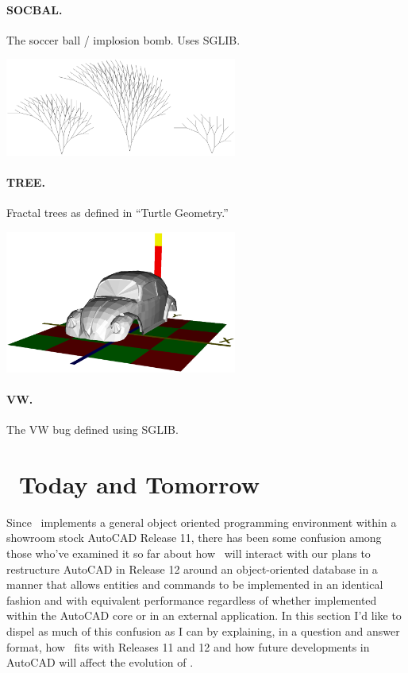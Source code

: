 \documentclass{article}
\begin{document}
\paragraph{SOCBAL.}  The soccer ball / implosion bomb.  Uses SGLIB.

\centerline{\includegraphics[width=3in]{cwfig13.eps}}
\paragraph{TREE.}  Fractal trees as defined in ``Turtle Geometry.''

\centerline{\includegraphics[width=3in]{cwfig7.eps}}
\paragraph{VW.}  The VW bug defined using SGLIB.

\section{\cw\ Today and Tomorrow}

Since \cw\ implements a general object oriented programming
environment within a showroom stock AutoCAD Release 11, there has been
some confusion among those who've examined it so far about how \cw\
will interact with our plans to restructure AutoCAD in Release 12
around an object-oriented database in a manner that allows entities
and commands to be implemented in an identical fashion and with
equivalent performance regardless of whether implemented within the
AutoCAD core or in an external application.  In this section I'd like
to dispel as much of this confusion as I can by explaining, in a
question and answer format, how \cw\ fits with Releases 11 and 12 and
how future developments in AutoCAD will affect the evolution of \cw .
\end{document}
